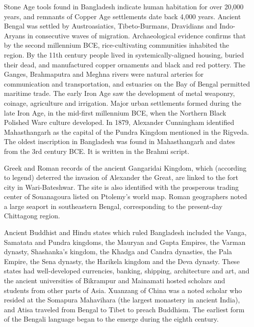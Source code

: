Stone Age tools found in Bangladesh indicate human habitation for over
20,000 years, and remnants of Copper Age settlements date back 4,000
years. Ancient Bengal was settled by Austroasiatics, Tibeto-Burmans,
Dravidians and Indo-Aryans in consecutive waves of migration.
Archaeological evidence confirms that by the second millennium BCE,
rice-cultivating communities inhabited the region. By the 11th century
people lived in systemically-aligned housing, buried their dead, and
manufactured copper ornaments and black and red pottery. The Ganges,
Brahmaputra and Meghna rivers were natural arteries for communication
and transportation, and estuaries on the Bay of Bengal permitted
maritime trade. The early Iron Age saw the development of metal
weaponry, coinage, agriculture and irrigation. Major urban settlements
formed during the late Iron Age, in the mid-first millennium BCE, when
the Northern Black Polished Ware culture developed. In 1879, Alexander
Cunningham identified Mahasthangarh as the capital of the Pundra Kingdom
mentioned in the Rigveda. The oldest inscription in Bangladesh was found
in Mahasthangarh and dates from the 3rd century BCE. It is written in
the Brahmi script.

Greek and Roman records of the ancient Gangaridai Kingdom, which
(according to legend) deterred the invasion of Alexander the Great, are
linked to the fort city in Wari-Bateshwar. The site is also identified
with the prosperous trading center of Souanagoura listed on Ptolemy's
world map. Roman geographers noted a large seaport in southeastern
Bengal, corresponding to the present-day Chittagong region.

Ancient Buddhist and Hindu states which ruled Bangladesh included the
Vanga, Samatata and Pundra kingdoms, the Mauryan and Gupta Empires, the
Varman dynasty, Shashanka's kingdom, the Khadga and Candra dynasties,
the Pala Empire, the Sena dynasty, the Harikela kingdom and the Deva
dynasty. These states had well-developed currencies, banking, shipping,
architecture and art, and the ancient universities of Bikrampur and
Mainamati hosted scholars and students from other parts of Asia.
Xuanzang of China was a noted scholar who resided at the Somapura
Mahavihara (the largest monastery in ancient India), and Atisa traveled
from Bengal to Tibet to preach Buddhism. The earliest form of the
Bengali language began to the emerge during the eighth century.


